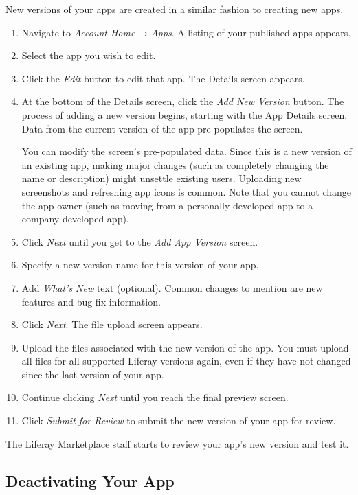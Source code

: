 New versions of your apps are created in a similar fashion to creating
new apps.

\begin{enumerate}
\def\labelenumi{\arabic{enumi}.}
\item
  Navigate to \emph{Account Home} → \emph{Apps}. A listing of your
  published apps appears.
\item
  Select the app you wish to edit.
\item
  Click the \emph{Edit} button to edit that app. The Details screen
  appears.
\item
  At the bottom of the Details screen, click the \emph{Add New Version}
  button. The process of adding a new version begins, starting with the
  App Details screen. Data from the current version of the app
  pre-populates the screen.

  You can modify the screen's pre-populated data. Since this is a new
  version of an existing app, making major changes (such as completely
  changing the name or description) might unsettle existing users.
  Uploading new screenshots and refreshing app icons is common. Note
  that you cannot change the app owner (such as moving from a
  personally-developed app to a company-developed app).
\item
  Click \emph{Next} until you get to the \emph{Add App Version} screen.
\item
  Specify a new version name for this version of your app.
\item
  Add \emph{What's New} text (optional). Common changes to mention are
  new features and bug fix information.
\item
  Click \emph{Next}. The file upload screen appears.
\item
  Upload the files associated with the new version of the app. You must
  upload all files for all supported Liferay versions again, even if
  they have not changed since the last version of your app.
\item
  Continue clicking \emph{Next} until you reach the final preview
  screen.
\item
  Click \emph{Submit for Review} to submit the new version of your app
  for review.
\end{enumerate}

The Liferay Marketplace staff starts to review your app's new version
and test it.

\subsection{Deactivating Your App}\label{deactivating-your-app}

